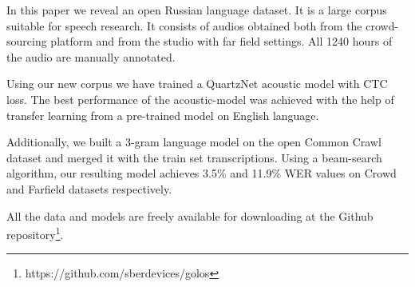 \documentclass[a4paper]{article}
\begin{document}
In this paper we reveal an open Russian language dataset. It is a large corpus suitable for speech research. It consists of audios obtained both from the crowd-sourcing platform and from the studio with far field settings. All 1240 hours of the audio are manually annotated.

Using our new corpus we have trained a QuartzNet acoustic model with CTC loss. The best performance of the acoustic-model was achieved with the help of transfer learning from a pre-trained model on English language. 

Additionally, we built a 3-gram language model on the open Common Crawl dataset and merged it with the train set transcriptions. Using a beam-search algorithm, our resulting model achieves 3.5\% and 11.9\% WER values on Crowd and Farfield datasets respectively.

All the data and models are freely available for downloading at the Github repository\footnote{https://github.com/sberdevices/golos}.







\end{document}
